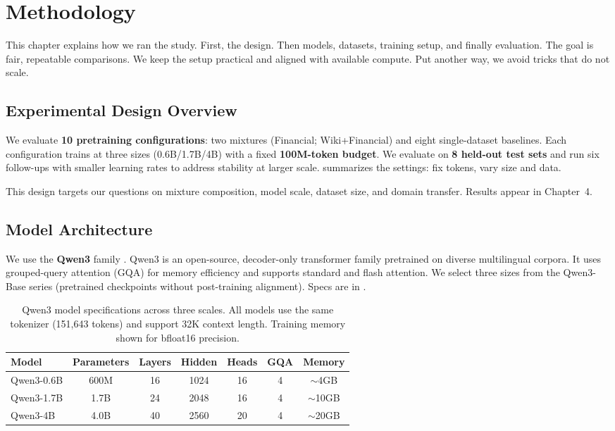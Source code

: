 \chapter{Methodology}

This chapter explains how we ran the study. First, the design. Then models, datasets, training setup, and finally evaluation. The goal is fair, repeatable comparisons. We keep the setup practical and aligned with available compute. Put another way, we avoid tricks that do not scale.

\section{Experimental Design Overview}

We evaluate \textbf{10 pretraining configurations}: two mixtures (Financial; Wiki+Financial) and eight single-dataset baselines. Each configuration trains at three sizes (0.6B/1.7B/4B) with a fixed \textbf{100M-token budget}. We evaluate on \textbf{8 held-out test sets} and run six follow-ups with smaller learning rates to address stability at larger scale.  summarizes the settings: fix tokens, vary size and data.



This design targets our questions on mixture composition, model scale, dataset size, and domain transfer. Results appear in Chapter~4.

\section{Model Architecture}

We use the \textbf{Qwen3} family \parencite{yang2024qwen2}. Qwen3 is an open-source, decoder-only transformer family pretrained on diverse multilingual corpora. It uses grouped-query attention (GQA) for memory efficiency and supports standard and flash attention. We select three sizes from the Qwen3-Base series (pretrained checkpoints without post-training alignment). Specs are in .

\begin{table}[h]
\centering
\caption[Qwen3 Model Specifications]{Qwen3 model specifications across three scales. All models use the same tokenizer (151,643 tokens) and support 32K context length. Training memory shown for bfloat16 precision.}
\label{tab:model_specs}
\begin{tabular}{lcccccc}
\toprule
\textbf{Model} & \textbf{Parameters} & \textbf{Layers} & \textbf{Hidden} & \textbf{Heads} & \textbf{GQA} & \textbf{Memory} \\
\midrule
Qwen3-0.6B & 600M & 16 & 1024 & 16 & 4 & $\sim$4GB \\
Qwen3-1.7B & 1.7B & 24 & 2048 & 16 & 4 & $\sim$10GB \\
Qwen3-4B & 4.0B & 40 & 2560 & 20 & 4 & $\sim$20GB \\
\bottomrule
\end{tabular}
\end{table}

